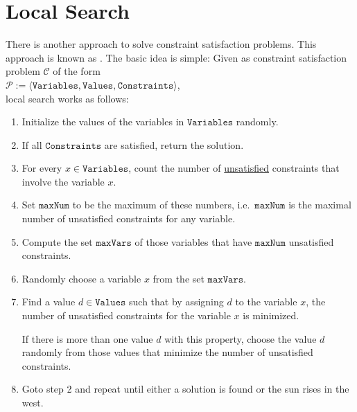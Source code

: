 \section{Local Search}
There is another approach to solve constraint satisfaction problems.  This approach is known as
.  The basic idea is simple: Given as constraint satisfaction problem 
$\mathcal{C}$ of the form 
\\[0.2cm]
\hspace*{1.3cm}
$\mathcal{P} := \langle \texttt{Variables}, \texttt{Values}, \texttt{Constraints} \rangle$,
\\[0.2cm] 
local search works as follows:
\begin{enumerate}
\item Initialize the values of the variables in $\texttt{Variables}$ randomly.  
\item If all $\texttt{Constraints}$ are satisfied, return the solution.
\item For every  $x \in \texttt{Variables}$, count the number of \underline{unsatisfied} constraints that involve the
      variable $x$. 
\item Set $\texttt{maxNum}$ to be the maximum of these numbers, i.e.~$\texttt{maxNum}$ is the maximal number of
      unsatisfied constraints for any variable.
\item Compute the set $\texttt{maxVars}$ of those variables that have $\texttt{maxNum}$ unsatisfied constraints.
\item Randomly choose a variable $x$ from the set $\texttt{maxVars}$.
\item Find a value $d \in \texttt{Values}$ such that by assigning $d$ to the variable $x$, the number of
      unsatisfied constraints for the variable $x$ is minimized.  

      If there is more than one value $d$ with this property, choose the value $d$ randomly from those values
      that minimize the number of unsatisfied constraints.
\item Goto step 2 and repeat until either a solution is found or the sun rises in the west.
\end{enumerate}

